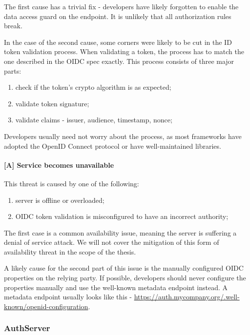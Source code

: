 The first cause has a trivial fix - developers have likely forgotten to enable the data access guard on the endpoint. It is unlikely that all authorization rules break.

In the case of the second cause, some corners were likely to be cut in the ID token validation process. When validating a token, the process has to match the one described in the OIDC spec \cite{oidc} exactly. This process consists of three major parts:

\begin{enumerate}
  \item check if the token's crypto algorithm is as expected;
  \item validate token signature;
  \item validate claims - issuer, audience, timestamp, nonce;
\end{enumerate}

Developers usually need not worry about the process, as most frameworks have adopted the OpenID Connect protocol or have well-maintained libraries.

\paragraph{[A] Service becomes unavailable} This threat is caused by one of the following:

\begin{enumerate}
  \item server is offline or overloaded;
  \item OIDC token validation is misconfigured to have an incorrect authority;
\end{enumerate}

The first case is a common availability issue, meaning the server is suffering a denial of service attack. We will not cover the mitigation of this form of availability threat in the scope of the thesis.

A likely cause for the second part of this issue is the manually configured OIDC properties on the relying party. If possible, developers should never configure the properties manually and use the well-known metadata endpoint instead. A metadata endpoint usually looks like this - \url{https://auth.mycompany.org/.well-known/openid-configuration}.

\subsubsection{AuthServer}

